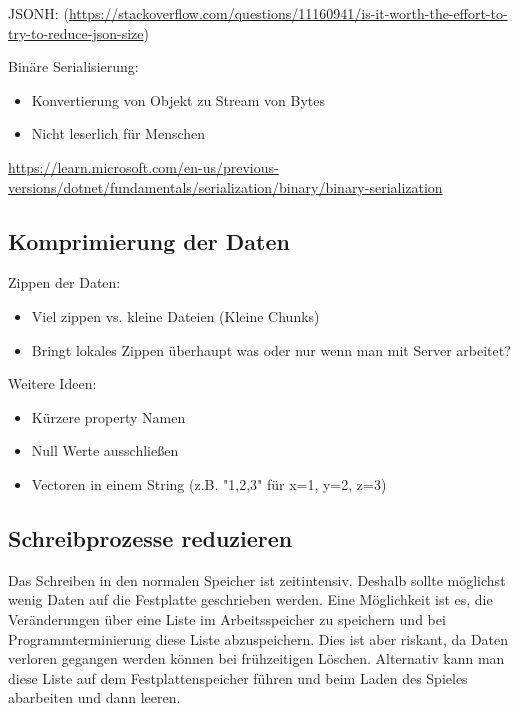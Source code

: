 JSONH: (\url{https://stackoverflow.com/questions/11160941/is-it-worth-the-effort-to-try-to-reduce-json-size})



Binäre Serialisierung:
\begin{itemize}
    \item Konvertierung von Objekt zu Stream von Bytes
    \item Nicht leserlich für Menschen
\end{itemize}
\url{https://learn.microsoft.com/en-us/previous-versions/dotnet/fundamentals/serialization/binary/binary-serialization}


\subsection{Komprimierung der Daten}
Zippen der Daten:
\begin{itemize}
    \item Viel zippen vs. kleine Dateien (Kleine Chunks)
    \item Bringt lokales Zippen überhaupt was oder nur wenn man mit Server arbeitet?
\end{itemize}

Weitere Ideen:
\begin{itemize}
    \item Kürzere property Namen
    \item Null Werte ausschließen
    \item Vectoren in einem String (z.B. "1,2,3" für x=1, y=2, z=3)
\end{itemize}


\subsection{Schreibprozesse reduzieren}
Das Schreiben in den normalen Speicher ist zeitintensiv. Deshalb sollte möglichst wenig Daten auf die Festplatte geschrieben werden. Eine Möglichkeit ist es, die Veränderungen über eine Liste im Arbeitsspeicher zu speichern und bei Programmterminierung diese Liste abzuspeichern. Dies ist aber riskant, da Daten verloren gegangen werden können bei frühzeitigen Löschen. Alternativ kann man diese Liste auf dem Festplattenspeicher führen und beim Laden des Spieles abarbeiten und dann leeren.




